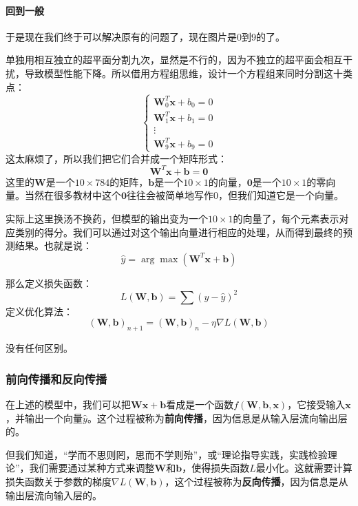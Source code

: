 \documentclass[fontset=none]{ctexart}
\begin{document}
\paragraph{回到一般}

于是现在我们终于可以解决原有的问题了，现在图片是0到9的了。

单独用相互独立的超平面分割九次，显然是不行的，因为不独立的超平面会相互干扰，导致模型性能下降。所以借用方程组思维，设计一个方程组来同时分割这十类点：
\[
    \begin{cases}
        \mathbf{W}^T_0\mathbf{x} + b_0 = 0 \\
        \mathbf{W}^T_1\mathbf{x} + b_1 = 0 \\
        \vdots \\
        \mathbf{W}^T_9\mathbf{x} + b_9 = 0
\end{cases}\]
这太麻烦了，所以我们把它们合并成一个矩阵形式：
\[\mathbf{W}^T\mathbf{x} + \mathbf{b} = \mathbf{0}\]
这里的$\mathbf{W}$是一个$10 \times 784$的矩阵，$\mathbf{b}$是一个$10 \times 1$的向量，$\mathbf{0}$是一个$10 \times 1$的零向量。当然在很多教材中这个$\mathbf{0}$往往会被简单地写作$0$，但我们知道它是一个向量。

实际上这里换汤不换药，但模型的输出变为一个$10 \times 1$的向量了，每个元素表示对应类别的得分。我们可以通过对这个输出向量进行相应的处理，从而得到最终的预测结果。也就是说：
\[\hat{y} =\arg\max(\mathbf{W}^T\mathbf{x} + \mathbf{b})\]

那么定义损失函数：
\[L(\mathbf{W}, \mathbf{b}) = \sum (y - \hat{y})^2\]
定义优化算法：
\[(\mathbf{W}, \mathbf{b})_{n+1} = (\mathbf{W}, \mathbf{b})_n - \eta \nabla L(\mathbf{W}, \mathbf{b})\]

没有任何区别。

\subsubsection{前向传播和反向传播}

在上述的模型中，我们可以把$\mathbf{W}\mathbf{x} + \mathbf{b}$看成是一个函数$f(\mathbf{W}, \mathbf{b}, \mathbf{x})$，它接受输入$\mathbf{x}$，并输出一个向量$\hat{y}$。这个过程被称为\textbf{前向传播}，因为信息是从输入层流向输出层的。

但我们知道，“学而不思则罔，思而不学则殆”，或“理论指导实践，实践检验理论”，我们需要通过某种方式来调整$\mathbf{W}$和$\mathbf{b}$，使得损失函数$L$最小化。这就需要计算损失函数关于参数的梯度$\nabla L(\mathbf{W}, \mathbf{b})$，这个过程被称为\textbf{反向传播}，因为信息是从输出层流向输入层的。
\end{document}
